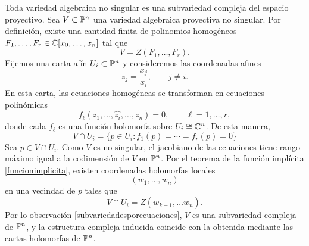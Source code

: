 	\begin{example}\label{algsonsubvariedades}
		Toda variedad algebraica no singular es una subvariedad compleja del espacio proyectivo. 
			Sea $V\subset\mathbb{P}^n$ una variedad algebraica proyectiva no singular. Por definición, existe una cantidad finita de polinomios homogéneos $F_1,\dots,F_r\in \mathbb{C}[x_0,\dots,x_n]$ tal que
			\begin{equation*}
				V=Z(F_1,\dots,F_r).
			\end{equation*}
			Fijemos una carta afín $U_i\subset \mathbb{P}^n$
			y consideremos las coordenadas afines
			\begin{equation*}
				z_j=\frac{x_j}{x_i},\qquad j\neq i.
			\end{equation*}
			En esta carta, las ecuaciones homogéneas se transforman en ecuaciones polinómicas
			\begin{equation*}
				f_\ell(z_1,\dots,\widehat{z_i},\dots,z_n)=0,
				\qquad \ell=1,\dots,r,
			\end{equation*}
			donde cada $f_\ell$ es una función holomorfa sobre $U_i\cong \mathbb{C}^n$. De esta manera,
			\begin{equation*}
				V\cap U_i=\{p\in U_i : f_1(p)=\cdots=f_r(p)=0\}
			\end{equation*}
			Sea $p\in V\cap U_i$. Como $V$ es no singular, el jacobiano de las ecuaciones tiene rango máximo igual a la codimensión de $V$ en $\mathbb{P}^n$. Por el teorema de la función implícita \ref{funcionimplicita}, existen coordenadas holomorfas locales
			\begin{equation*}
				(w_1,\dots,w_n)
			\end{equation*}
			en una vecindad de $p$ tales que
			\begin{equation*}
			 V\cap U_i=Z(w_{k+1},\dots w_n).
			\end{equation*}
			Por lo observación \ref{subvariedadesporecuaciones}, $V$ es una subvariedad compleja de $\mathbb{P}^n$, y la estructura compleja inducida coincide con la obtenida mediante las cartas holomorfas de $\mathbb{P}^n$.
	\end{example}

